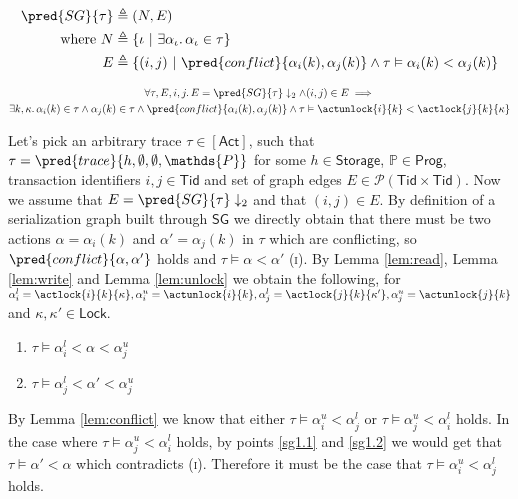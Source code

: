 \begin{align*}
\pred{SG}{\tau} &\triangleq (N, E) \\
\text{where } N &\triangleq \{ \iota\ |\ \exists \alpha_\iota \ldotp \alpha_\iota \in \tau \} \\
E &\triangleq \{ (i, j)\ |\ \pred{conflict}{\alpha_i(k), \alpha_j(k)} \land \tau \vDash \alpha_i(k) < \alpha_j(k) \}
\end{align*}

\lem \label{lem:sg1}
\begin{gather*}
\forall \tau, E, i, j \ldotp E = \pred{SG}{\tau} \downarrow_2 \land (i, j) \in E \implies \\
\exists k, \kappa \ldotp \alpha_i(k) \in \tau \land \alpha_j(k) \in \tau \land \pred{conflict}{\alpha_i(k), \alpha_j(k)} \land \tau \vDash \actunlock{i}{k} < \actlock{j}{k}{\kappa}
\end{gather*}

Let's pick an arbitrary trace $\tau \in \mathsf{[Act]}$, such that $\tau = \pred{trace}{h, \emptyset, \emptyset, \mathds{P}}$ for some $h \in \mathsf{Storage}$, $\mathds{P} \in \mathsf{Prog}$, transaction identifiers $i, j \in \mathsf{Tid}$ and set of graph edges $E \in \mathcal{P}(\mathsf{Tid} \times \mathsf{Tid})$. Now we assume that $E = \pred{SG}{\tau} \downarrow_2$ and that $(i, j) \in E$. By definition of a serialization graph built through $\mathsf{SG}$ we directly obtain that there must be two actions $\alpha = \alpha_i(k)$ and $\alpha' = \alpha_j(k)$ in $\tau$ which are conflicting, so $\pred{conflict}{\alpha, \alpha'}$ holds and $\tau \vDash \alpha < \alpha'$ (\textsc{i}). By Lemma \ref{lem:read}, Lemma \ref{lem:write} and Lemma \ref{lem:unlock} we obtain the following, for $\alpha_i^l = \actlock{i}{k}{\kappa}, \alpha_i^u = \actunlock{i}{k}, \alpha_j^l = \actlock{j}{k}{\kappa'}, \alpha_j^u = \actunlock{j}{k}$ and $\kappa, \kappa' \in \mathsf{Lock}$.
\begin{enumerate}
\item \label{sg1.1} $\tau \vDash \alpha_i^l < \alpha < \alpha_j^u$
\item \label{sg1.2} $\tau \vDash \alpha_j^l < \alpha' < \alpha_j^u$
\end{enumerate}
By Lemma \ref{lem:conflict} we know that either $\tau \vDash \alpha_i^u < \alpha_j^l$ or $\tau \vDash \alpha_j^u < \alpha_i^l$ holds. In the case where $\tau \vDash \alpha_j^u < \alpha_i^l$ holds, by points \ref{sg1.1} and \ref{sg1.2} we would get that $\tau \vDash \alpha' < \alpha$ which contradicts (\textsc{i}). Therefore it must be the case that $\tau \vDash \alpha_i^u < \alpha_j^l$ holds.
